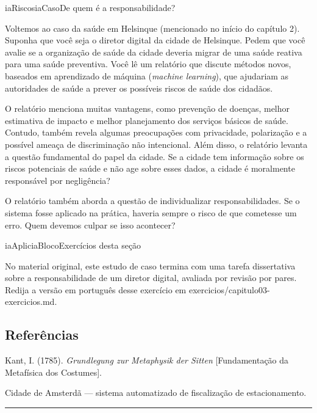 \documentclass[
  11pt,
]{article}
\renewcommand{\texttt}[1]{{\color{iaAmeixa}\small\ttfamily #1}}
\newenvironment{caso}[1][Caso]{\begin{iabox}{iaRiscos}{iaCaso}{#1}}{\end{iabox}}
\newenvironment{reflexao}[1][Para pensar]{\begin{iabox}{iaAplic}{iaBloco}{#1}}{\end{iabox}}
\begin{document}
\begin{caso}[De quem é a responsabilidade?]

Voltemos ao caso da saúde em Helsinque (mencionado no início do capítulo
2). Suponha que você seja o diretor digital da cidade de Helsinque.
Pedem que você avalie se a organização de saúde da cidade deveria migrar
de uma saúde reativa para uma saúde preventiva. Você lê um relatório que
discute métodos novos, baseados em aprendizado de máquina (\emph{machine
learning}), que ajudariam as autoridades de saúde a prever os possíveis
riscos de saúde dos cidadãos.

O relatório menciona muitas vantagens, como prevenção de doenças, melhor
estimativa de impacto e melhor planejamento dos serviços básicos de
saúde. Contudo, também revela algumas preocupações com privacidade,
polarização e a possível ameaça de discriminação não intencional. Além
disso, o relatório levanta a questão fundamental do papel da cidade. Se
a cidade tem informação sobre os riscos potenciais de saúde e não age
sobre esses dados, a cidade é moralmente responsável por negligência?

O relatório também aborda a questão de individualizar responsabilidades.
Se o sistema fosse aplicado na prática, haveria sempre o risco de que
cometesse um erro. Quem devemos culpar se isso acontecer?

\end{caso}

\begin{reflexao}[Exercícios desta seção]

No material original, este estudo de caso termina com uma tarefa
dissertativa sobre a responsabilidade de um diretor digital, avaliada
por revisão por pares. Redija a versão em português desse exercício em
\texttt{exercicios/capitulo03-exercicios.md}.

\end{reflexao}

\subsection{Referências}\label{referuxeancias}

Kant, I. (1785). \emph{Grundlegung zur Metaphysik der Sitten}
{[}Fundamentação da Metafísica dos Costumes{]}.

Cidade de Amsterdã --- sistema automatizado de fiscalização de
estacionamento.

\begin{center}\rule{0.5\linewidth}{0.5pt}\end{center}
\end{document}
